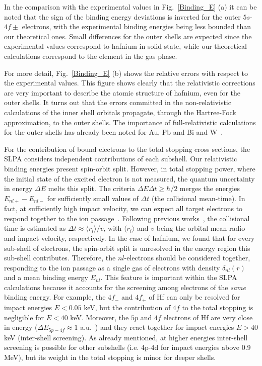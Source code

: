 \documentclass[aps,pra,reprint,superscriptaddress]{revtex4-1}
\begin{document}
In the comparison with the experimental values in Fig.~\ref{Binding_E} (a) 
it can be noted that the sign of the binding energy deviations is inverted 
for the outer $5s$-$4f\pm$ electrons, with the experimental binding energies 
being less bounded than our theoretical ones. Small differences for the 
outer shells are expected since the experimental values correspond to 
hafnium in solid-state, while our theoretical calculations correspond to 
the element in the gas phase.

For more detail, Fig.~\ref{Binding_E} (b) shows the relative errors 
with respect to the experimental  values. This figure shows clearly 
that the relativistic corrections are very 
important to describe the atomic structure of hafnium, even for the 
outer shells. It turns out that the errors committed in the 
non-relativistic calculations of the inner shell orbitals 
propagate, through the Hartree-Fock approximation, to the outer shells.
The importance of full-relativistic calculations for the outer 
shells has already been noted for Au, Pb and Bi and W~\cite{mon09}.


For the contribution of bound electrons to the total stopping 
cross sections, the SLPA considers independent contributions of each 
subshell. Our relativistic binding energies present spin-orbit split. 
However, in total stopping power, where the initial state of the 
excited electron is not measured, the quantum uncertainty in energy 
$\Delta E$ melts this split. The criteria $\Delta E\Delta t\geq\hbar/2$ 
merges the energies 
$E_{nl+}-E_{nl-}$ for sufficiently small values of $\Delta t$ (the 
collisional mean-time). In fact, at sufficiently high impact velocity, 
we can expect all target electrons to respond together to the ion 
passage~\cite{lindhard53,chu72}. Following previous works~\cite{mon09},
the collisional time is estimated as $\Delta t\approx\langle r_i\rangle/v$, 
with $\langle r_i\rangle$ and $v$ being the orbital mean radio and 
impact velocity, respectively. 
In the case of hafnium, we found that for every sub-shell of electrons, 
the spin-orbit split is unresolved in the energy region this sub-shell 
contributes. Therefore, the $nl$-electrons should be 
considered together, responding to the ion passage as a single gas of 
electrons with density $\delta_{nl}(r)$ and a mean binding energy 
$E_{nl}$. This feature is important within the SLPA calculations because 
it accounts for the screening among electrons of the \textit{same} 
binding energy. For example, the $4f_{-}$ and $4f_{+}$ of Hf can only 
be resolved for impact energies $E<0.05$ keV, but the contribution of 
$4f$ to the total stopping is negligible for $E<40$ keV. Moreover, the 
$5p$ and $4f$ electrons of Hf are very close in energy 
($\Delta E_{5p-4f} \approx 1$ a.u.~\cite{mendez2019}) and they react 
together for impact energies $E>40$ keV (inter-shell screening).
As already mentioned, at higher energies inter-shell screening is 
possible for other subshells (i.e. 4p-4d for impact energies above 
0.9 MeV), but its weight in the total stopping is minor for deeper shells.
\end{document}
